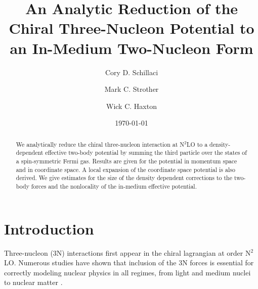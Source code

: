 \documentclass[%
 preprint,
 amsmath,amssymb,
 aps,
]{revtex4-1}
\begin{document}

\title{An Analytic Reduction of the Chiral Three-Nucleon Potential to an In-Medium Two-Nucleon Form}%

\author{Cory D. Schillaci}
\author{Mark C. Strother}
\author{Wick C. Haxton}%
%

\date{\today}%

\begin{abstract}
We analytically reduce the chiral three-nucleon interaction at N$^2$LO to a density-dependent effective two-body potential by summing the third particle over the states of a spin-symmetric Fermi gas. Results are given for the potential in momentum space and in coordinate space. A local expansion of the coordinate space potential is also derived. We give estimates for the size of the density dependent corrections to the two-body forces and the nonlocality of the in-medium effective potential.
\end{abstract}

\maketitle


\section{\label{sec:level1}Introduction}

Three-nucleon (3N) interactions first appear in the chiral lagrangian at order N$^2$LO. Numerous studies have shown that inclusion of the 3N forces is essential for correctly modeling nuclear physics in all regimes, from light and medium nuclei \cite{PhysRevLett.99.042501,0954-3899-39-8-085111} to nuclear matter \cite{PhysRevC.82.014314,PhysRevC.83.031301}.
\end{document}
